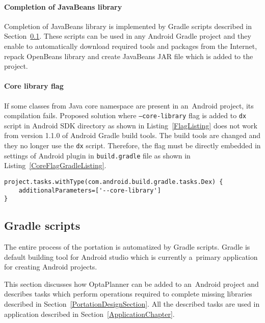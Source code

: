 \paragraph{Completion of JavaBeans library}
Completion of JavaBeans library is implemented by Gradle scripts described in Section~\ref{GradleScriptsSection}. These
scripts can be used in any Android Gradle project and they enable to automatically download required tools and packages
from the Internet, repack OpenBeans library and create JavaBeans JAR file which is added to the project.

\paragraph{Core library flag}
If some classes from Java core namespace are present in an~Android project, its compilation fails. Proposed solution
where \texttt{--core-library} flag is added to \texttt{dx} script in Android SDK directory as shown in
Listing~\ref{FlagListing} does not work from version 1.1.0 of Android Gradle build tools. The build tools are changed
and they no longer use the \texttt{dx} script. Therefore, the flag must be directly embedded in settings of Android
plugin in \texttt{build.gradle} file as shown in Listing~\ref{CoreFlagGradleListing}.
\\
\begin{lstlisting}[captionpos={b},caption={Addition of core library flag in \texttt{build.gradle} script.},frame={lines},
label={CoreFlagGradleListing},basicstyle=\footnotesize]
project.tasks.withType(com.android.build.gradle.tasks.Dex) {
    additionalParameters=['--core-library']
}
\end{lstlisting}

\subsection{Gradle scripts}\label{GradleScriptsSection}
The entire process of the portation is automatized by Gradle scripts. Gradle is default building tool for Android studio
which is currently a~primary application for creating Android projects.

This section discusses how OptaPlanner can be added to an~Android project and describes tasks which perform operations
required to complete missing libraries described in Section~\ref{PortationDesignSection}.  All the described tasks are
used in application described in Section~\ref{ApplicationChapter}.

